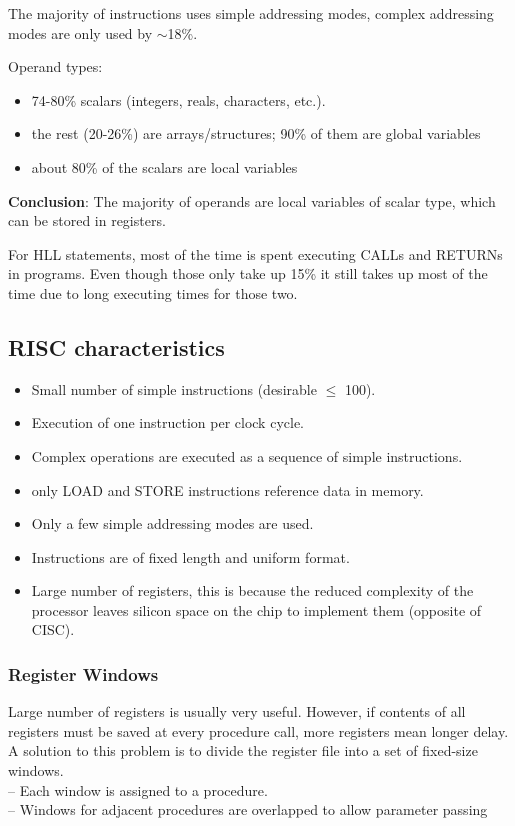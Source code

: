 The majority of instructions uses simple addressing modes, complex addressing modes are only used by $\sim$18\%.

Operand types:
\begin{itemize}
\item 74-80\% scalars (integers, reals, characters, etc.).
\item the rest (20-26\%) are arrays/structures; 90\% of them are global variables
\item about 80\% of the scalars are local variables
\end{itemize}

\textbf{Conclusion}: The majority of operands are local variables of scalar type, which can be stored in registers.

For HLL statements, most of the time is spent executing CALLs and RETURNs in programs. Even though those only take up 15\% it still takes up most of the time due to long executing times for those two.

\subsection{RISC characteristics}
\begin{itemize}
\item Small number of simple instructions (desirable $\leq$ 100).
\item Execution of one instruction per clock cycle.
\item Complex operations are executed as a sequence of simple instructions.
\item only LOAD and STORE instructions reference data in memory.
\item Only a few simple addressing modes are used.
\item Instructions are of fixed length and uniform format.
\item Large number of registers, this is because the reduced complexity of the processor leaves silicon space on the chip to implement them (opposite of CISC).
\end{itemize}

\subsubsection{Register Windows}
Large number of registers is usually very useful. However, if contents of all registers must be saved at every procedure call, more registers mean longer delay. A solution to this problem is to divide the register file into a set of fixed-size windows. \\
-- Each window is assigned to a procedure. \\
-- Windows for adjacent procedures are overlapped to allow parameter passing \\

